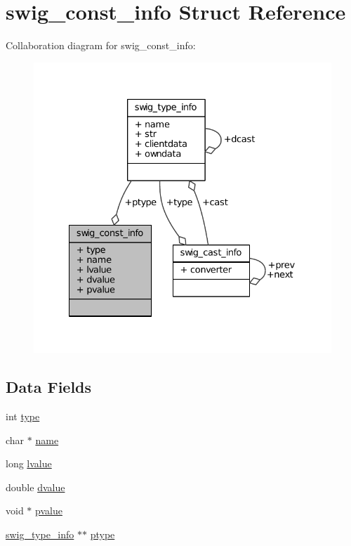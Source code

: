 \hypertarget{structswig__const__info}{\section{swig\-\_\-const\-\_\-info Struct Reference}
\label{structswig__const__info}
}


Collaboration diagram for swig\-\_\-const\-\_\-info\-:
\nopagebreak
\begin{figure}[H]
\begin{center}
\leavevmode
\includegraphics[width=330pt]{structswig__const__info__coll__graph}
\end{center}
\end{figure}
\subsection*{Data Fields}
\begin{DoxyCompactItemize}
\item 
int \hyperlink{structswig__const__info_ac765329451135abec74c45e1897abf26}{type}
\item 
char $\ast$ \hyperlink{structswig__const__info_a5ac083a645d964373f022d03df4849c8}{name}
\item 
long \hyperlink{structswig__const__info_ad27f45c6331d8b6ac603e0cae235fb61}{lvalue}
\item 
double \hyperlink{structswig__const__info_ab88920172b5a32b077bd95bb1f3d6f8e}{dvalue}
\item 
void $\ast$ \hyperlink{structswig__const__info_a728d7ae5aaef6e9bdb0ec8a4e5c429b7}{pvalue}
\item 
\hyperlink{structswig__type__info}{swig\-\_\-type\-\_\-info} $\ast$$\ast$ \hyperlink{structswig__const__info_ad55d59eb3cf7a2bb1fa92d92d42e782b}{ptype}
\end{DoxyCompactItemize}


